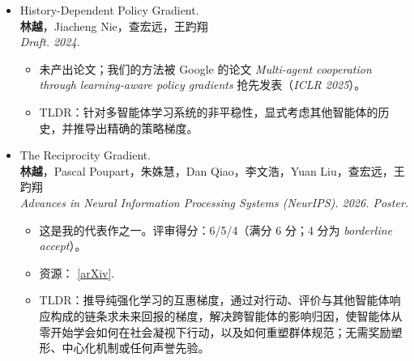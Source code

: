 \documentclass[a4paper,20pt]{article}
\begin{document}
\begin{itemize}[leftmargin=*,itemsep=0pt,topsep=0pt,partopsep=0pt]
          \begin{itemize}[itemsep=0pt,topsep=0pt,partopsep=0pt]
              \item 该工作被
                    \textit{Evaluating LLMs in Open-Source Games}
                    抢先发表。此后我们计划大幅改进，但后续方向又被 Google DeepMind 的
                    \textit{Code-Space Response Oracles: Generating Interpretable Multi-Agent Policies with Large Language Models}
                    抢先发表。
              \item 资源：
                    \href{https://arxiv.org/abs/2512.21024}{[手稿]}.
              \item TLDR：将每个智能体的策略表示为可读的源代码，并提出程序化迭代最佳响应，使大语言模型利用博弈收益和单元测试反馈，针对另一策略改写自身的策略代码。
          \end{itemize}
    \item History-Dependent Policy Gradient. \\
          \textbf{林越}，Jiacheng Nie，查宏远，王趵翔 \\
          \textit{Draft. 2024.}
          \begin{itemize}[itemsep=0pt,topsep=0pt,partopsep=0pt]
              \item 未产出论文；我们的方法被 Google 的论文
                    \textit{Multi-agent cooperation through learning-aware policy gradients}
                    抢先发表（\textit{ICLR 2025}）。
              \item TLDR：针对多智能体学习系统的非平稳性，显式考虑其他智能体的历史，并推导出精确的策略梯度。
          \end{itemize}
    \item The Reciprocity Gradient. \\
          \textbf{林越}，Pascal Poupart，朱姝慧，Dan Qiao，李文浩，Yuan Liu，查宏远，王趵翔 \\
          \textit{Advances in Neural Information Processing Systems (NeurIPS). 2026. Poster.}
          \begin{itemize}[itemsep=0pt,topsep=0pt,partopsep=0pt]
              \item 这是我的代表作之一。评审得分：6/5/4（满分 6 分；4 分为 \textit{borderline accept}）。
              \item 资源：
                    \href{https://arxiv.org/abs/2605.08323}{[arXiv]}.
              \item TLDR：推导纯强化学习的互惠梯度，通过对行动、评价与其他智能体响应构成的链条求未来回报的梯度，解决跨智能体的影响归因，使智能体从零开始学会如何在社会凝视下行动，以及如何重塑群体规范；无需奖励塑形、中心化机制或任何声誉先验。

\end{itemize}
\end{itemize}
\end{document}
